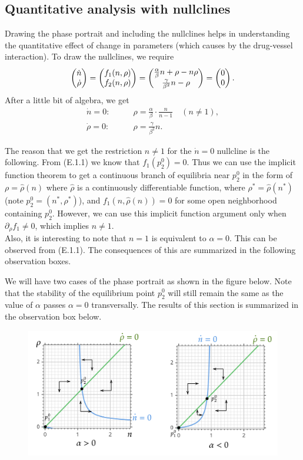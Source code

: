 \subsection*{Quantitative analysis with nullclines}
Drawing the phase portrait and including the nullclines helps in understanding the quantitative effect of change in parameters (which causes by the drug-vessel interaction). To draw the nullclines, we require
\[ \begin{pmatrix} \dot{n} \\ \dot{\rho} \end{pmatrix} = \begin{pmatrix} f_1(n,\rho) \\ f_2(n,\rho) \end{pmatrix} = \begin{pmatrix} \frac{\alpha}{\beta}n + \rho - n\rho \\ \frac{\gamma}{\beta^2}n - \rho \end{pmatrix} = \begin{pmatrix} 0 \\ 0 \end{pmatrix}. \]
After a little bit of algebra, we get
\begin{align*}
	\dot{n} = 0:& \qquad \rho = \frac{\alpha}{\beta}\cdot \frac{n}{n-1} \quad (n\neq 1),\\
	\dot{\rho} = 0:& \qquad \rho = \frac{\gamma}{\beta^2}n.
\end{align*}
\begin{observation}
	The reason that we get the restriction $n\neq 1$ for the $\dot{n} = 0$ nullcline is the following. From (E.1.1) we know that $f_1(p^0_2)=0$. Thus we can use the implicit function theorem to get a continuous branch of equilibria near $p_2^0$ in the form of $\rho = \hat{\rho}(n)$ where $\hat{\rho}$ is a continuously differentiable function, where $\rho^* = \hat{\rho}(n^*)$ (note $p^0_2 = (n^*, \rho^*)$), and $f_1(n,\hat{\rho}(n)) = 0$ for some open neighborhood containing $p_2^0$. However, we can use this implicit function argument only when $\partial_\rho f_1 \neq 0$, which implies $n\neq 1$.\\
	Also, it is interesting to note that $n=1$ is equivalent to $\alpha=0$. This can be observed from (E.1.1). The consequences of this are summarized in the following observation boxes.
\end{observation}

We will have two cases of the phase portrait as shown in the figure below. Note that the stability of the equilibrium point $p_2^0$ will still remain the same as the value of $\alpha$ passes $\alpha=0$ transversally. The results of this section is summarized in the observation box below.
\begin{figure}[h!]
	\centering
	\includegraphics[width=\linewidth]{images/nullClines_positiveNegative.png} %
\end{figure}


